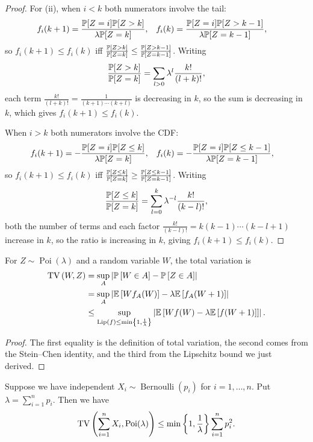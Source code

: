 \begin{proof}
	For (ii), when $i < k$ both numerators involve the tail:
	\begin{align*}
		f_i(k+1) &= \frac{\P[Z=i] \P[Z > k]}{\lambda \P[Z=k]}, &
		f_i(k)   &= \frac{\P[Z=i] \P[Z > k-1]}{\lambda \P[Z=k-1]},
	\end{align*}
	so $f_i(k+1) \le f_i(k)$ iff $\frac{\P[Z>k]}{\P[Z=k]} \le \frac{\P[Z>k-1]}{\P[Z=k-1]}$. Writing
	\[
		\frac{\P[Z > k]}{\P[Z=k]} = \sum\limits_{l > 0} \lambda^l \frac{k!}{(l+k)!},
	\]
	each term $\frac{k!}{(l+k)!} = \frac{1}{(k+1)\cdots(k+l)}$ is decreasing in $k$, so the sum is decreasing in $k$, which gives $f_i(k+1) \le f_i(k)$.

	When $i > k$ both numerators involve the CDF:
	\begin{align*}
		f_i(k+1) &= -\frac{\P[Z=i] \P[Z \le k]}{\lambda \P[Z=k]}, &
		f_i(k)   &= -\frac{\P[Z=i] \P[Z \le k-1]}{\lambda \P[Z=k-1]},
	\end{align*}
	so $f_i(k+1) \le f_i(k)$ iff $\frac{\P[Z\le k]}{\P[Z=k]} \ge \frac{\P[Z\le k-1]}{\P[Z=k-1]}$. Writing
	\[
		\frac{\P[Z \le k]}{\P[Z=k]} = \sum\limits_{l=0}^{k} \lambda^{-l} \frac{k!}{(k-l)!},
	\]
	both the number of terms and each factor $\frac{k!}{(k-l)!} = k(k-1)\cdots(k-l+1)$ increase in $k$, so the ratio is increasing in $k$, giving $f_i(k+1) \le f_i(k)$.
\end{proof}

\begin{proposition}
	For $Z \sim \operatorname{Poi}(\lambda)$ and a random variable $W$, the total variation is
	\begin{align*}
		\TV\left( W,Z \right)
		&= \sup_A \left| \P\left[W \in A\right]  - \P\left[Z \in A\right]  \right| \\
		&= \sup_A \left| \E\left[W f_A(W) \right] - \lambda \E\left[f_A(W+1)\right]  \right| \\
		&\le \sup_{\operatorname{Lip}(f) \le \min\left\{1, \frac{1}{\lambda}\right\}} \left| \E\left[W f(W) - \lambda\E\left[f(W+1)\right] \right]  \right|
	.\end{align*}
\end{proposition}

\begin{proof}
	The first equality is the definition of total variation, the second comes from the Stein--Chen identity, and the third from the Lipschitz bound we just derived.
\end{proof}

\begin{theorem}
	Suppose we have independent $X_i \sim \operatorname{Bernoulli}(p_i)$ for $i=1,\ldots,n$. Put $\lambda = \sum_{i=1}^{n} p_i$. Then we have \[
		\TV\left( \sum_{i=1}^{n} X_i, \operatorname{Poi}(\lambda) \right) \le \min \left\{1,\frac{1}{\lambda}\right\} \sum_{i=1}^{n} p_i^2
	.\] 
\end{theorem}

